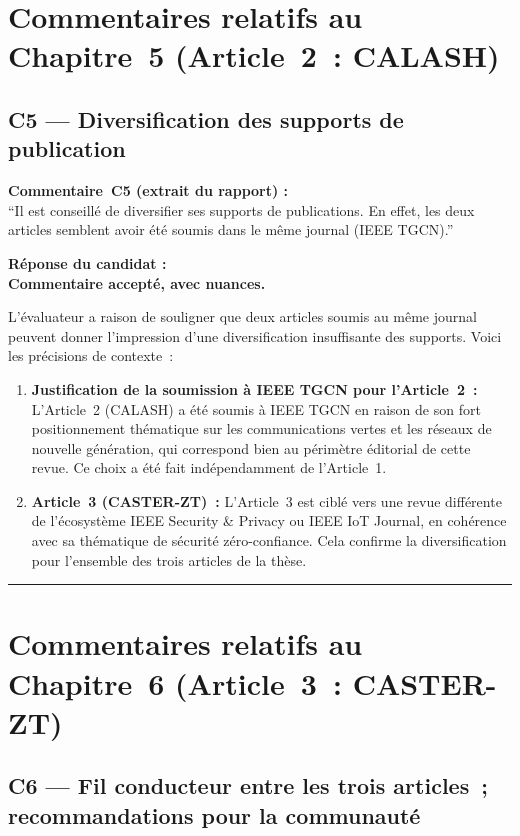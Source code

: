 \documentclass[12pt,a4paper]{article}
\newcommand{\Commentaire}[2]{%
  \begin{reviewerbox}
    \textbf{Commentaire~#1 (extrait du rapport) :}\\#2
  \end{reviewerbox}%
}
\newcommand{\Reponse}[1]{%
  \begin{responsebox}
    \textbf{Réponse du candidat :}\\#1
  \end{responsebox}%
}
\begin{document}
\section*{Commentaires relatifs au Chapitre~5 (Article~2~: CALASH)}

\subsection*{C5 --- Diversification des supports de publication}

\Commentaire{C5}{
  ``Il est conseillé de diversifier ses supports de publications. En effet, les deux articles
  semblent avoir été soumis dans le même journal (IEEE TGCN).''
}

\Reponse{
\textbf{Commentaire accepté, avec nuances.}

L'évaluateur a raison de souligner que deux articles soumis au même journal peuvent donner l'impression d'une diversification insuffisante des supports. Voici les précisions de contexte~:

\begin{enumerate}[leftmargin=*, label=(\roman*)]
  \item \textbf{Justification de la soumission à IEEE TGCN pour l'Article~2~:} L'Article~2 (CALASH) a été soumis à IEEE TGCN en raison de son fort positionnement thématique sur les communications vertes et les réseaux de nouvelle génération, qui correspond bien au périmètre éditorial de cette revue. Ce choix a été fait indépendamment de l'Article~1.
  \item \textbf{Article~3 (CASTER-ZT)~:} L'Article~3 est ciblé vers une revue différente de l'écosystème IEEE Security \& Privacy ou IEEE IoT Journal, en cohérence avec sa thématique de sécurité zéro-confiance. Cela confirme la diversification pour l'ensemble des trois articles de la thèse.
\end{enumerate}
}

\bigskip
\hrule
\bigskip

\section*{Commentaires relatifs au Chapitre~6 (Article~3~: CASTER-ZT)}

\subsection*{C6 --- Fil conducteur entre les trois articles~; recommandations pour la communauté}
\end{document}
